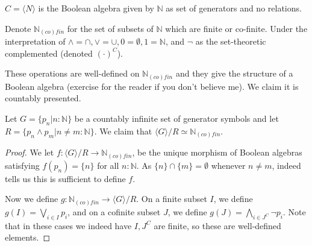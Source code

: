 \documentclass{../util/zariski-small}
\begin{document}
\begin{example}\label{ExampleBAunderCantor}
  $C = \langle N \rangle $ is the Boolean algebra given by $\mathbb N$ as set of generators and no relations. 
\end{example}
\begin{example}\label{ExampleBAunderNinfty}
  Denote $\mathbb N_{(co)fin}$ for the set of subsets of $\mathbb N$ which are finite or co-finite. 
  Under the interpretation of $\wedge = \cap , \vee = \cup, 0 = \emptyset, 1 = \mathbb N$, and $\neg$ 
  as the set-theoretic complemented (denoted $(\cdot)^C$). 

  These operations are well-defined on $\mathbb N_{(co)fin}$ 
  and they give the structure of a Boolean algebra (exercise for the reader if you don't believe me). 
  We claim it is countably presented. 

  Let $G = \{p_n| n:\mathbb N\} $ be a countably infinite set of generator symbols and let 
  $R = \{ p_n \wedge p_m | n\neq m :\mathbb N \}$. 
  We claim that $\langle G \rangle / R \simeq \mathbb N_{(co)fin}$. 

\begin{proof}
  We let $f:\langle G \rangle / R \to \mathbb N_{(co)fin}$, be the unique morphism of Boolean algebras 
  satisfying $f(p_n) = \{n\}$ for all $n:\mathbb N$. As $\{n\} \cap \{m\} = \emptyset$ whenever $n\neq m$, 
   indeed tells us this is sufficient to define $f$. 

  Now we define $g:\mathbb N_{(co)fin} \to \langle G \rangle / R$. 
  On a finite subset $I$, we define $g(I) = \bigvee_{i\in I} p_i$, 
  and on a cofinite subset $J$, we define $g(J) = \bigwedge _{i \in J^C} \neg p_i$. 
  Note that in these cases we indeed have $I,J^C$ are finite, so these are well-defined elements. 


\end{proof}
\end{example}
\end{document}
